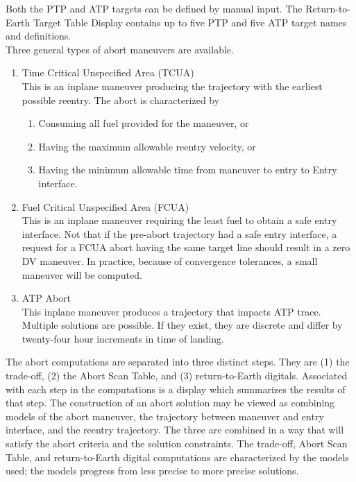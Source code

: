\documentclass[11pt]{article} %
\begin{document}
Both the PTP and ATP targets can be defined by manual input. The Return-to-Earth Target Table Display contains up to five PTP and five ATP target names and definitions.\\

Three general types of abort maneuvers are available.

\begin{enumerate}
	\item Time Critical Unspecified Area (TCUA)\\
	This is an inplane maneuver producing the trajectory with the earliest possible reentry. The abort is characterized by
	\begin{enumerate}
		\item Consuming all fuel provided for the maneuver, or
		\item Having the maximum allowable reentry velocity, or
		\item Having the minimum allowable time from maneuver to entry to Entry interface.
	\end{enumerate}
	\item Fuel Critical Unspecified Area (FCUA)\\
	This is an inplane maneuver requiring the least fuel to obtain a safe entry interface. Not that if the pre-abort trajectory had a safe entry interface, a request for a FCUA abort having the same target line should result in a zero DV maneuver. In practice, because of convergence tolerances, a small maneuver will be computed.
	\item ATP Abort\\
	This inplane maneuver produces a trajectory that impacts ATP trace. Multiple solutions are possible. If they exist, they are discrete and differ by twenty-four hour increments in time of landing.\\
\end{enumerate}

The abort computations are separated into three distinct steps. They are (1) the trade-off, (2) the Abort Scan Table, and (3) return-to-Earth digitals. Associated with each step in the computations is a display which summarizes the results of that step. The construction of an abort solution may be viewed as combining models of the abort maneuver, the trajectory between maneuver and entry interface, and the reentry trajectory. The three are combined in a way that will satisfy the abort criteria and the solution constraints. The trade-off, Abort Scan Table, and return-to-Earth digital computations are characterized by the models used; the models progress from less precise to more precise solutions.\\
\end{document}
